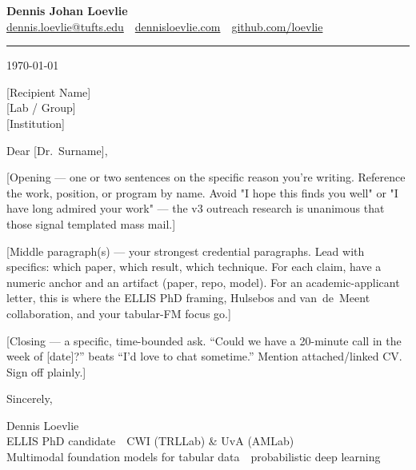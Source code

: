 \documentclass[11pt,letterpaper]{article}
\newcommand{\bdash}{\,\textemdash\,}
\begin{document}
{\sffamily\fontsize{18pt}{22pt}\selectfont\bfseries\color{accent} Dennis Johan Loevlie}\\[2pt]
{\sffamily\footnotesize\color{meta}%
\href{mailto:dennis.loevlie@tufts.edu}{dennis.loevlie@tufts.edu} \,\textperiodcentered\,
\href{https://dennisloevlie.com}{dennisloevlie.com} \,\textperiodcentered\,
\href{https://github.com/loevlie}{github.com/loevlie}}\\[2pt]
{\color{rule}\rule{\linewidth}{0.5pt}}

\vspace{1.2em}

\today
\vspace{1em}

{[Recipient Name]}\\
{[Lab / Group]}\\
{[Institution]}\\

\vspace{0.5em}

Dear [Dr.~Surname],

\vspace{0.4em}

[Opening — one or two sentences on the specific reason you're writing.
Reference the work, position, or program by name. Avoid "I hope this
finds you well" or "I have long admired your work" — the
v3 outreach research is unanimous that those signal templated mass mail.]

\vspace{0.4em}

[Middle paragraph(s) — your strongest credential paragraphs. Lead with
specifics: which paper, which result, which technique. For each claim,
have a numeric anchor and an artifact (paper, repo, model). For an
academic-applicant letter, this is where the ELLIS PhD framing,
Hulsebos and van~de~Meent collaboration, and your tabular-FM focus go.]

\vspace{0.4em}

[Closing — a specific, time-bounded ask. ``Could we have a 20-minute
call in the week of [date]?'' beats ``I'd love to chat sometime.''
Mention attached/linked CV. Sign off plainly.]

\vspace{0.4em}

Sincerely,

\vspace{2em}

Dennis Loevlie\\
{\sffamily\footnotesize\color{meta}%
ELLIS PhD candidate \bdash{} CWI (TRLLab) \& UvA (AMLab) \\
Multimodal foundation models for tabular data \bdash{} probabilistic deep learning}
\end{document}
